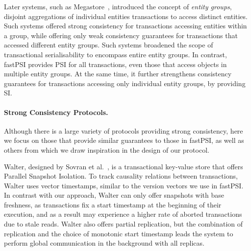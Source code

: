 Later systems, such as Megastore~\citep{baker_megastore}, introduced the concept of \emph{entity groups}, disjoint aggregations of individual entities transactions to access distinct entities. Such systems offered strong consistency for transactions accessing entities within a group, while offering only weak consistency guarantees for transactions that accessed different entity groups. Such systems broadened the scope of transactional serialisability to encompass entire entity groups. In contrast, fastPSI provides PSI for all transactions, even those that access objects in multiple entity groups. At the same time, it further strengthens consistency guarantees for transactions accessing only individual entity groups, by providing SI.

\paragraph{Strong Consistency Protocols.} Although there is a large variety of protocols providing strong consistency, here we focus on those that provide similar guarantees to those in fastPSI, as well as others from which we draw inspiration in the design of our protocol.


Walter, designed by Sovran et al.~\citep{psi-intro}, is a transactional key-value store that offers Parallel Snapshot Isolation. To track causality relations between transactions, Walter uses vector timestamps, similar to the version vectors we use in fastPSI. In contrast with our approach, Walter can only offer snapshots with base freshness, as transactions fix a start timestamp at the beginning of their execution, and as a result may experience a higher rate of aborted transactions due to stale reads. Walter also offers partial replication, but the combination of replication and the choice of monotonic start timestamp leads the system to perform global communication in the background with all replicas.


